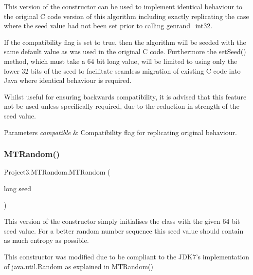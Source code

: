 This version of the constructor can be used to implement identical behaviour to the original C code version of this algorithm including exactly replicating the case where the seed value had not been set prior to calling genrand\+\_\+int32. 

If the compatibility flag is set to true, then the algorithm will be seeded with the same default value as was used in the original C code. Furthermore the set\+Seed() method, which must take a 64 bit long value, will be limited to using only the lower 32 bits of the seed to facilitate seamless migration of existing C code into Java where identical behaviour is required. 

Whilst useful for ensuring backwards compatibility, it is advised that this feature not be used unless specifically required, due to the reduction in strength of the seed value.


\begin{DoxyParams}{Parameters}
{\em compatible} & Compatibility flag for replicating original behaviour. \\
\hline
\end{DoxyParams}
\mbox{\label{class_project3_1_1_m_t_random_a302f2ba4ac375c97e7d1b71017f272ba}} 
\subsubsection{\texorpdfstring{MTRandom()}{MTRandom()}\hspace{0.1cm}{\footnotesize\ttfamily [3/5]}}
{\footnotesize\ttfamily Project3.\+M\+T\+Random.\+M\+T\+Random (\begin{DoxyParamCaption}\item[{long}]{seed }\end{DoxyParamCaption})}

This version of the constructor simply initialises the class with the given 64 bit seed value. For a better random number sequence this seed value should contain as much entropy as possible. \begin{DoxyVerb}This constructor was modified due to be compliant to the JDK7's implementation
of java.util.Random as explained in MTRandom()
\end{DoxyVerb}
 
